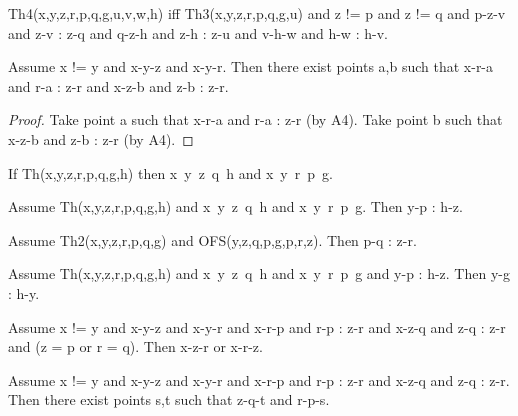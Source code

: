 \documentclass{article}
\begin{document}
\begin{forthel}
    \begin{definition}[C5_1e]
      Th4(x,y,z,r,p,q,g,u,v,w,h) iff Th3(x,y,z,r,p,q,g,u) and z != p and z != q
      and p-z-v and z-v : z-q and q-z-h and z-h : z-u and v-h-w and h-w : h-v.
    \end{definition}


    \begin{lemma}[C5_1f]
      Assume x != y and x-y-z and x-y-r. Then there exist points a,b such that
      x-r-a and r-a : z-r and x-z-b and z-b : z-r.
    \end{lemma}
    \begin{proof}
    	Take point a such that x-r-a and r-a : z-r (by A4).
    	Take point b such that x-z-b and z-b : z-r (by A4).
    \end{proof}

    \begin{axiom}[C5_1g]
      If Th(x,y,z,r,p,q,g,h) then x~y~z~q~h and x~y~r~p~g.
    \end{axiom}

    \begin{axiom}[C5_1h]
      Assume Th(x,y,z,r,p,q,g,h) and x~y~z~q~h and x~y~r~p~g. Then y-p : h-z.
    \end{axiom}

    \begin{axiom}[C5_1i]
      Assume Th2(x,y,z,r,p,q,g) and OFS(y,z,q,p,g,p,r,z). Then p-q : z-r.
    \end{axiom}

    \begin{axiom}[C5_1j]
      Assume Th(x,y,z,r,p,q,g,h) and x~y~z~q~h and x~y~r~p~g and y-p : h-z. Then
      y-g : h-y.
    \end{axiom}



    \begin{lemma}[C5_1k]
      Assume x != y and x-y-z and x-y-r and x-r-p and r-p : z-r and x-z-q and
      z-q : z-r and (z = p or r = q). Then x-z-r or x-r-z.
    \end{lemma}

    \begin{lemma}[C5_1l]
      Assume x != y and x-y-z and x-y-r and x-r-p and r-p : z-r and x-z-q and
      z-q : z-r. Then there exist points s,t such that z-q-t and r-p-s.
    \end{lemma}


\end{forthel}
\end{document}
